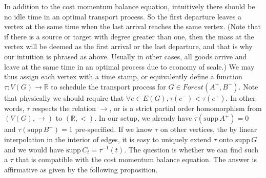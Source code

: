 \documentclass[fleqn]{article}
\theoremstyle{definition}
\theoremstyle{remark}
\newcommand{\supp}{\mathrm{supp}\,} %
\begin{document}
In addition to the cost momentum balance equation, intuitively there should be no idle time in an optimal transport process. So the first departure leaves a vertex at the same time when the last arrival reaches the same vertex. (Note that if there is a source or target with degree greater than one, then the mass at the vertex will be deemed as the first arrival or the last departure, and that is why our intuition is phrased as above. Usually in other cases, all goods arrive and leave at the same time in an optimal process due to economy of scale.) We may thus assign each vertex with a time stamp, or equivalently define a function $\tau: V(G)\rightarrow \mathbb{R}$ to schedule the transport process for $G\in Forest(A^+,B^-)$. Note that physically we should require that $\forall e\in E(G), \tau(e^-) <\tau(e^+)$. In other words, $\tau$ respects the relation $\rightarrow$, or is a strict partial order homomorphism from $(V(G),\rightarrow)$ to $(\mathbb{R},<)$. In our setup, we already have $\tau(\supp A^+)={0}$ and $\tau(\supp B^-)={1}$ pre-specified. If we know $\tau$ on other vertices, the by linear interpolation in the interior of edges, it is easy to uniquely extend $\tau$ onto $\supp G$ and we would have $\supp C_t =\tau^{-1}(t)$. The question is whether we can find such a $\tau$ that is compatible with the cost momentum balance equation. The answer is affirmative as given by the following proposition.
\end{document}

